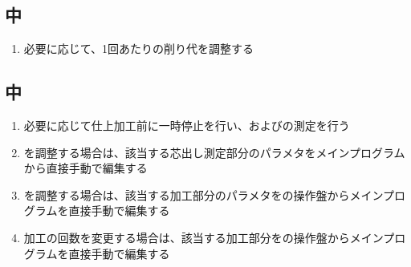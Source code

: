\subsection{\EndFacecutMilling 中}
\begin{enumerate}[label=\sarrow]
\item 必要に応じて、1回あたりの削り代を調整する
\end{enumerate}


\subsection{\OutcutMilling 中}
\begin{enumerate}[label=\sarrow]
\item 必要に応じて仕上加工前に一時停止を行い、\OutcutAsideThickness および\OutcutWidth の測定を行う
\item \OutcutAsideThickness を調整する場合は、該当する芯出し測定部分のパラメタをメインプログラムから直接手動で編集する
\item \OutcutWidth を調整する場合は、該当する加工部分のパラメタを\MMC の操作盤からメインプログラムを直接手動で編集する
\item {}加工の回数を変更する場合は、該当する加工部分を\MMC の操作盤からメインプログラムを直接手動で編集する
\end{enumerate}


